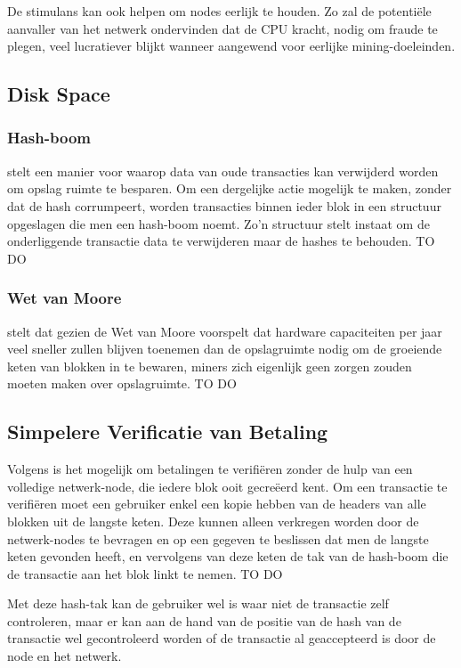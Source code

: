 		De stimulans kan ook helpen om nodes eerlijk te houden. Zo zal de potentiële aanvaller van het netwerk ondervinden dat de CPU kracht, nodig om fraude te plegen, veel lucratiever blijkt wanneer aangewend voor eerlijke mining-doeleinden. 
		
		
		
	\subsection{Disk Space}
		\subsubsection{Hash-boom}
		\textcite{Nakamoto2008} stelt  een manier voor waarop data van oude transacties kan verwijderd worden om opslag ruimte te besparen. Om een dergelijke actie mogelijk te maken, zonder dat de hash corrumpeert, worden transacties binnen ieder blok in een structuur opgeslagen die men een hash-boom noemt. Zo’n structuur stelt instaat om de onderliggende transactie data te verwijderen maar de hashes te behouden. TO DO
		\subsubsection{Wet van Moore}	
		\textcite{Nakamoto2008} stelt dat gezien de Wet van Moore voorspelt dat hardware capaciteiten per jaar veel sneller zullen blijven toenemen dan de opslagruimte nodig om de groeiende keten van blokken in te bewaren, miners zich eigenlijk geen zorgen zouden moeten maken over opslagruimte. TO DO
		\subsection{Simpelere Verificatie van Betaling}
		Volgens \textcite{Nakamoto2008} is het mogelijk om betalingen te verifiëren zonder de hulp van een volledige netwerk-node, die iedere blok ooit gecreëerd kent. Om een transactie te verifiëren moet een gebruiker enkel een kopie hebben van de headers van alle blokken uit de langste keten. Deze kunnen alleen verkregen worden door de netwerk-nodes te bevragen en op een gegeven te beslissen dat men de langste keten gevonden heeft, en vervolgens van deze keten de tak van de hash-boom die de transactie aan het blok linkt te nemen.  TO DO
	
		Met deze hash-tak kan de gebruiker wel is waar niet de transactie zelf controleren, maar er kan aan de hand van de positie van de hash van de transactie wel gecontroleerd worden of de transactie al geaccepteerd is door de node en het netwerk.
		
